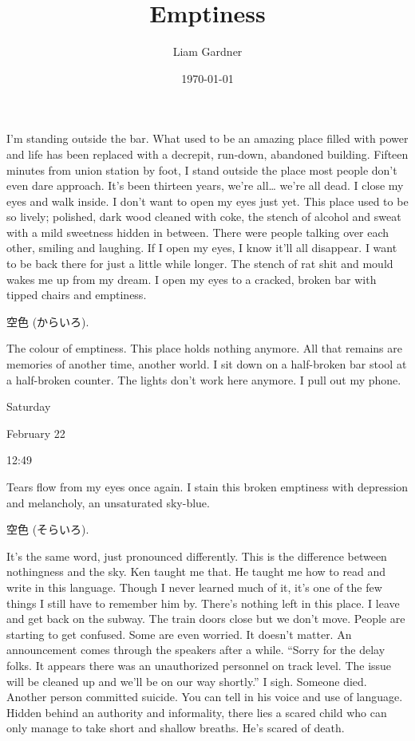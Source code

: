\documentclass[a4paper, 12pt]{book}
\title{Emptiness}
\author{Liam Gardner}
\date{\today}
\begin{document}
\newcommand\tab[1][1cm]{\hspace*{#1}}
\maketitle
\tab
I’m standing outside the bar. What used to be an amazing place filled with power and life has been replaced with a decrepit, run-down, abandoned building. Fifteen minutes from union station by foot, I stand outside the place most people don’t even dare approach. It’s been thirteen years, we’re all… we’re all dead. I close my eyes and walk inside.
\newline
\tab
I don’t want to open my eyes just yet. This place used to be so lively; polished, dark wood cleaned with coke, the stench of alcohol and sweat with a mild sweetness hidden in between. There were people talking over each other, smiling and laughing. If I open my eyes, I know it’ll all disappear. I want to be back there for just a little while longer.
\newline
\tab
The stench of rat shit and mould wakes me up from my dream. I open my eyes to a cracked, broken bar with tipped chairs and emptiness. 
\begin{CJK}{UTF8}{min}
空色 (からいろ). 
\end{CJK}
The colour of emptiness. This place holds nothing anymore. All that remains are memories of another time, another world. I sit down on a half-broken bar stool at a half-broken counter. The lights don’t work here anymore. I pull out my phone.
\newline
\newline
\centerline{Saturday}
\newline
\centerline{February 22}
\newline
\centerline{12:49}
\newline
\newline
Tears flow from my eyes once again. I stain this broken emptiness with depression and melancholy, an unsaturated sky-blue. 
\begin{CJK}{UTF8}{min}
空色 (そらいろ). 
\end{CJK}
It’s the same word, just pronounced differently. This is the difference between nothingness and the sky. Ken taught me that. He taught me how to read and write in this language. Though I never learned much of it, it’s one of the few things I still have to remember him by. There’s nothing left in this place.
\newline
\tab
I leave and get back on the subway. The train doors close but we don’t move. People are starting to get confused. Some are even worried. It doesn’t matter. An announcement comes through the speakers after a while. ``Sorry for the delay folks. It appears there was an unauthorized personnel on track level. The issue will be cleaned up and we’ll be on our way shortly.'' I sigh. Someone died. Another person committed suicide. You can tell in his voice and use of language. Hidden behind an authority and informality, there lies a scared child who can only manage to take short and shallow breaths. He’s scared of death.
\end{document}
